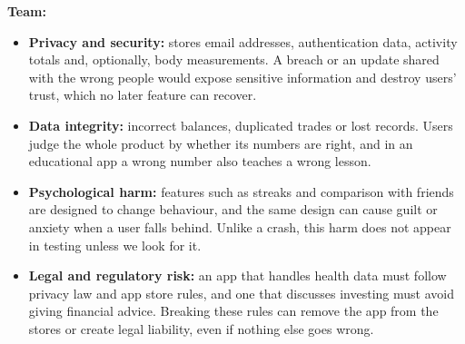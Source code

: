 \documentclass{article}
\begin{document}
    \textbf{Team:}
    \begin{itemize}
      \item \textbf{Privacy and security:} \progname{} stores email addresses,
      authentication data, activity totals and, optionally, body measurements.
      A breach or an update shared with the wrong people would expose
      sensitive information and destroy users' trust, which no later feature
      can recover.
      \item \textbf{Data integrity:} incorrect balances, duplicated trades or
      lost records. Users judge the whole product by whether its numbers are
      right, and in an educational app a wrong number also teaches a wrong
      lesson.
      \item \textbf{Psychological harm:} features such as streaks and
      comparison with friends are designed to change behaviour, and the same
      design can cause guilt or anxiety when a user falls behind. Unlike a
      crash, this harm does not appear in testing unless we look for it.
      \item \textbf{Legal and regulatory risk:} an app that handles health data
      must follow privacy law and app store rules, and one that discusses
      investing must avoid giving financial advice. Breaking these rules can
      remove the app from the stores or create legal liability, even if
      nothing else goes wrong.
    \end{itemize}
\newpage{}
\end{document}
